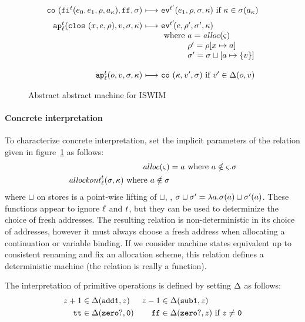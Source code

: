 \documentclass[preprint,onecolumn,9pt]{sigplanconf} %
\begin{document}
\begin{figure}
\begin{gather*}
\begin{array}{@{}r@{\ }c@{\ }l@{}}
\\
\co{\kif[^\mcntr]{\mexpi0,\mexpi1,\menv,\maddr_\mkont},\sfalse,\msto} & \machstep&
\ev[^{\mcntr'}]{\mexpi1,\menv,\msto,\mkont}
\text{ if }\mkont\in\msto(\maddr_\mkont)
\\[2mm]
\ap[^\mcntr_\mlab]{\clos{\mvar,\mexp,\menv},\mval,\msto,\mkont} & \machstep&
\ev[^{\mcntr'}\!]{\mexp,\menv',\msto',\mkont}
\\
&&\text{ where } \maddr  =\alloc(\mstate) \\
&&\phantom{\text{ where }} \menv' = \menv[\mvar\mapsto\maddr] \\
&&\phantom{\text{ where }} \msto' = \msto\sqcup[\maddr\mapsto\{\mval\}] \\
\\
\ap[^\mcntr_\mlab]{\mop,\mval,\msto,\mkont} & \machstep&
\co{\mkont,\mval',\msto}
\text{ if } \mval'\in\interpdelta(\mop,\mval)
\end{array}
\end{gather*}
\caption{Abstract abstract machine for ISWIM}
\label{fig:aam}
\end{figure}


\paragraph{Concrete interpretation} To characterize concrete interpretation, set the implicit
parameters of the relation given in figure~\ref{fig:aam} as follows:
\begin{align*}
\mathit{alloc}(\varsigma) &= a \mbox{ where } a \notin \varsigma.\sigma \\
\mathit{allockont}^{t}_{\ell}(\sigma,\kappa) \mbox{ where } a \notin \sigma
\end{align*}
where $\sqcup$ on stores is a point-wise lifting of $\sqcup$, \ie, $\sigma
\sqcup \sigma' = \lambda a. \sigma(a) \sqcup
\sigma'(a)$. These functions appear to ignore ${\ell}$ and
${t}$, but they can be used to determinize the choice of fresh
addresses.  The resulting relation is non-deterministic in its choice
of addresses, however it must always choose a fresh address when
allocating a continuation or variable binding.  If we consider machine
states equivalent up to consistent renaming and fix an allocation
scheme, this relation defines a deterministic machine (the relation is
really a function).

The interpretation of primitive operations is defined by setting
$\Delta$ as follows:
\begin{align*}
z+1 &\in \Delta({\tt add1},z) &
z-1 &\in \Delta({\tt sub1},z)\\
{\tt tt} &\in \Delta({\tt zero?},{\tt 0}) &
{\tt ff} &\in \Delta({\tt zero?},z)\text{ if }z\neq {\tt 0}\\
\end{align*}
\end{document}
